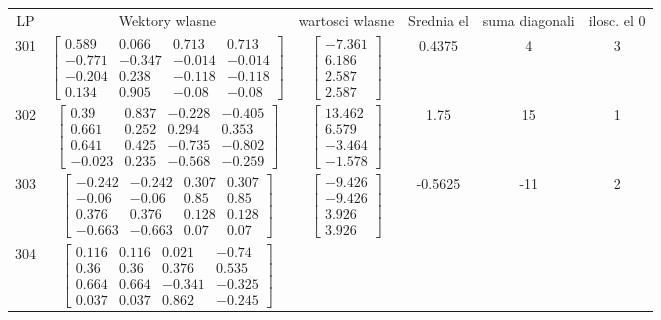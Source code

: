 \documentclass[a4paper,12pt]{article}
\begin{document}
\bgroup {} \vspace{0.2in} \begin{tabular}{c c c c c c}
LP &Wektory wlasne & wartosci wlasne & Srednia el & suma diagonali & ilosc. el 0\\
301
&
$\begin{bmatrix} 0.589 & 0.066 & 0.713 & 0.713 \\ -0.771 & -0.347 & -0.014 & -0.014 \\ -0.204 & 0.238 & -0.118 & -0.118 \\ 0.134 & 0.905 & -0.08 & -0.08 \end{bmatrix}$
&
$\begin{bmatrix} -7.361 \\ 6.186 \\ 2.587 \\ 2.587 \end{bmatrix}$
&
0.4375
&
4
&
3
\\
302
&
$\begin{bmatrix} 0.39 & 0.837 & -0.228 & -0.405 \\ 0.661 & 0.252 & 0.294 & 0.353 \\ 0.641 & 0.425 & -0.735 & -0.802 \\ -0.023 & 0.235 & -0.568 & -0.259 \end{bmatrix}$
&
$\begin{bmatrix} 13.462 \\ 6.579 \\ -3.464 \\ -1.578 \end{bmatrix}$
&
1.75
&
15
&
1
\\
303
&
$\begin{bmatrix} -0.242 & -0.242 & 0.307 & 0.307 \\ -0.06 & -0.06 & 0.85 & 0.85 \\ 0.376 & 0.376 & 0.128 & 0.128 \\ -0.663 & -0.663 & 0.07 & 0.07 \end{bmatrix}$
&
$\begin{bmatrix} -9.426 \\ -9.426 \\ 3.926 \\ 3.926 \end{bmatrix}$
&
-0.5625
&
-11
&
2
\\
304
&
$\begin{bmatrix} 0.116 & 0.116 & 0.021 & -0.74 \\ 0.36 & 0.36 & 0.376 & 0.535 \\ 0.664 & 0.664 & -0.341 & -0.325 \\ 0.037 & 0.037 & 0.862 & -0.245 \end{bmatrix}$

\end{tabular}
\end{document}
